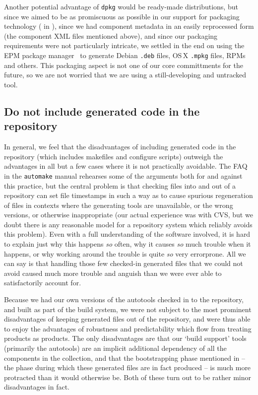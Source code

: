 \documentclass{speauth}
\begin{document}
Another potential advantage of \texttt{dpkg} would be ready-made
distributions, but since we aimed to be as promiscuous as possible in
our support for packaging technology ( in
), since we had component metadata in an
easily reprocessed form (the component XML files mentioned above), and
since our packaging requirements were not particularly intricate, we
settled in the end on using the EPM package manager~\cite{epm} to
generate Debian \texttt{.deb} files, OS\,X \texttt{.mpkg} files, RPMs
and others.  This packaging aspect is not one of our core committments
for the future, so we are not worried that we are using a
still-developing and untracked tool.

\subsection{Do not include generated code in the repository}
\label{s:generated}

In general, we feel that the disadvantages of including generated code
in the repository (which includes makefiles and configure scripts)
outweigh the advantages in all but a few cases where it is not
practically avoidable.  The FAQ in the \texttt{automake} manual
rehearses some of the arguments both for and against this practice,
but the central problem is that checking files into and out of a
repository can set file timestamps in such a way as to cause spurious
regeneration of files in contexts where the generating tools are
unavailable, or the wrong versions, or otherwise inappropriate (our
actual experience was with CVS, but we doubt there is any reasonable
model for a repository system which reliably avoids this problem).  Even
with a full understanding of the software involved, it is hard to
explain just why this happens \emph{so} often, why it causes \emph{so}
much trouble when it happens, or why working around the trouble is
quite \emph{so} very errorprone.  All we can say is that handling
those few checked-in generated files that we could not avoid caused
much more trouble and anguish than we were ever able to satisfactorily
account for.

Because we had our own versions of the autotools checked in to the
repository, and built as part of the build system, we were not subject
to the most prominent disadvantages of keeping generated files out of
the repository, and were thus able to enjoy the advantages of
robustness and predictability which flow from treating products as
products.  The only disadvantages are that our `build support' tools
(primarily the autotools) are an implicit additional dependency of all
the components in the collection, and that the bootstrapping phase
mentioned in  -- the phase during which these
generated files are in fact produced -- is much more protracted than
it would otherwise be.  Both of these turn out to be rather minor
disadvantages in fact.
\end{document}
